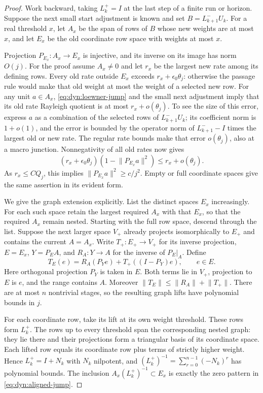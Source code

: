 \documentclass[11pt]{article}
\theoremstyle{definition}
\theoremstyle{remark}
\newcommand{\norm}[1]{\lVert#1\rVert}
\numberwithin{equation}{section}
\begin{document}
\begin{proof}
Work backward, taking $L_k^+=I$ at the last step of a finite run or
horizon.  Suppose the next small start adjustment is known and set
$B=L_{k+1}^-U_k$.  For a real threshold $x$, let $A_x$ be the span of
rows of $B$ whose new weights are at most $x$, and let $E_x$ be the old
coordinate row space with weights at most $x$.

Projection $P_{E_x}:A_x\to E_x$ is injective, and its inverse on its
image has norm $O(j)$.  For the proof assume $A_x\ne0$ and let $r_x$
be the largest new rate among its defining rows.  Every old rate
outside $E_x$ exceeds $r_x+\epsilon_0\theta_j$: otherwise the passage
rule would make that old weight at most the weight of a selected new
row.  For any unit $a\in A_x$, \eqref{eq:dyn:loewner-jump} and the
small next adjustment imply that its old rate Rayleigh quotient is at
most $r_x+o(\theta_j)$.  To see the size of this error, express $a$ as
a combination of the selected rows of $L_{k+1}^-U_k$; its coefficient
norm is $1+o(1)$, and the error is bounded by the operator norm of
$L_{k+1}^- -I$ times the largest old or new rate.  The regular rate
bounds make that error $o(\theta_j)$, also at a macro junction.
Nonnegativity of all old rates now gives
\[
 (r_x+\epsilon_0\theta_j)
       (1-\norm{P_{E_x}a}^2)
 \le r_x+o(\theta_j).
\]
As $r_x\le C Q_j$, this implies
$\norm{P_{E_x}a}^2\ge c/j^2$.  Empty or full coordinate spaces give
the same assertion in its evident form.

We give the graph extension explicitly.  List the distinct spaces
$E_x$ increasingly.  For each such space retain the largest required
$A_x$ with that $E_x$, so that the required $A_x$ remain nested.
Starting with the full row space, descend through the list.  Suppose
the next larger space $V_+$ already projects isomorphically to $E_+$
and contains the current $A=A_x$.  Write $T_+:E_+\to V_+$ for its
inverse projection, $E=E_x$, $Y=P_EA$, and $R_A:Y\to A$ for the
inverse of $P_E|_A$.  Define
\begin{equation}
 T_E(e)=R_A(P_Ye)+T_+((I-P_Y)e),\qquad e\in E.
 \label{eq:dyn:graph-extension}
\end{equation}
Here orthogonal projection $P_Y$ is taken in $E$.  Both terms lie in
$V_+$, projection to $E$ is $e$, and the range contains $A$.
Moreover $\norm{T_E}\le\norm{R_A}+\norm{T_+}$.
There are at most $n$ nontrivial stages, so the resulting graph lifts
have polynomial bounds in $j$.

For each coordinate row, take its lift at its own weight threshold.
These rows form $L_k^+$.  The rows up to every threshold span the
corresponding nested graph: they lie there and their projections form
a triangular basis of its coordinate space.  Each lifted row equals
its coordinate row plus terms of strictly higher weight.  Hence
$L_k^+=I+N_k$ with $N_k$ nilpotent, and
$(L_k^+)^{-1}=\sum_{r=0}^{n-1}(-N_k)^r$ has polynomial bounds.
The inclusion $A_x(L_k^+)^{-1}\subset E_x$ is exactly the zero pattern
in \eqref{eq:dyn:aligned-jump}.


\end{proof}
\end{document}
